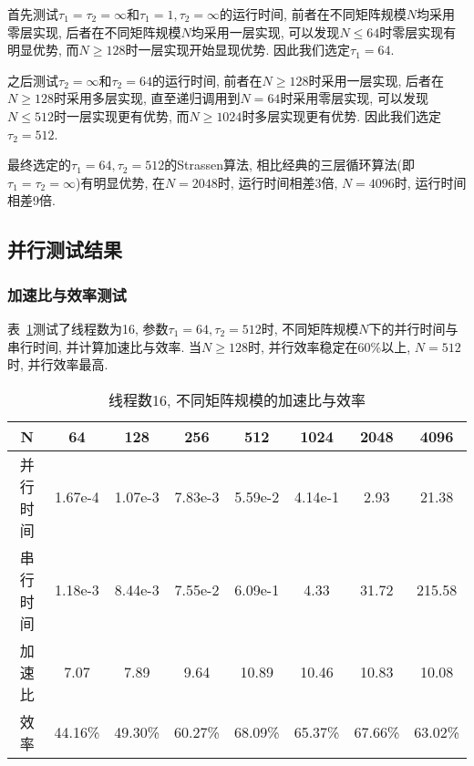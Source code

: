 \documentclass[szjs]{cjcmltx}
\begin{document}
首先测试$\tau_1=\tau_2=\infty$和$\tau_1=1,\tau_2=\infty$的运行时间, 前者在不同矩阵规模$N$均采用零层实现, 后者在不同矩阵规模$N$均采用一层实现, 可以发现$N\leq 64$时零层实现有明显优势, 而$N\geq 128$时一层实现开始显现优势. 因此我们选定$\tau_1=64$.

之后测试$\tau_2=\infty$和$\tau_2=64$的运行时间, 前者在$N\geq 128$时采用一层实现, 后者在$N\geq 128$时采用多层实现, 直至递归调用到$N=64$时采用零层实现, 可以发现$N\leq 512$时一层实现更有优势, 而$N\geq 1024$时多层实现更有优势. 因此我们选定$\tau_2=512$.

最终选定的$\tau_1=64,\tau_2=512$的Strassen算法, 相比经典的三层循环算法(即$\tau_1=\tau_2=\infty$)有明显优势, 在$N=2048$时, 运行时间相差3倍, $N=4096$时, 运行时间相差9倍.

\subsection{并行测试结果}

\subsubsection{加速比与效率测试}
表~\ref{tab:4}测试了线程数为16, 参数$\tau_1=64,\tau_2=512$时, 不同矩阵规模$N$下的并行时间与串行时间, 并计算加速比与效率. 当$N\geq 128$时, 并行效率稳定在60\%以上, $N=512$时, 并行效率最高.

\begin{table}[htbp]\centering\caption{线程数16, 不同矩阵规模的加速比与效率}\label{tab:4}
\begin{tabular}{|c|c|c|c|c|c|c|c|}\hline
N  & 64 & 128 & 256 & 512 & 1024 & 2048 & 4096\\
\hline
并行时间  & 1.67e-4 & 1.07e-3 & 7.83e-3 & 5.59e-2 & 4.14e-1 & 2.93 & 21.38\\
\hline
串行时间  & 1.18e-3 & 8.44e-3 & 7.55e-2 & 6.09e-1 & 4.33 & 31.72 & 215.58\\
\hline
加速比  & 7.07 & 7.89 & 9.64 & 10.89 & 10.46 & 10.83 & 10.08\\
\hline
效率 & 44.16\% &  49.30\% & 60.27\% & 68.09\% & 65.37\% & 67.66\% & 63.02\%\\
\hline
\end{tabular}
\end{table}
\end{document}
